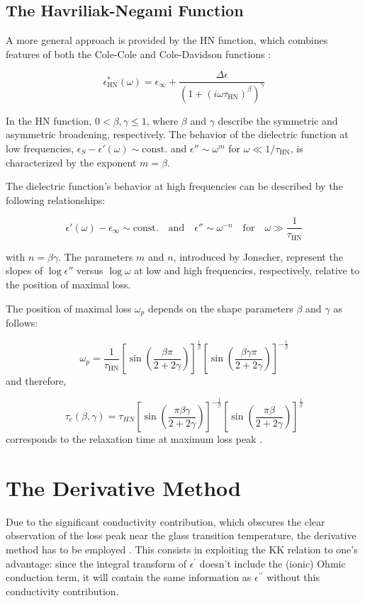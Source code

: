\subsection{The Havriliak-Negami Function}
A more general approach is provided by the \ac{HN} function, which combines features of both the Cole-Cole and Cole-Davidson functions \cite{kremer2003}:

\[
\epsilon^*_{\text{HN}}(\omega) = \epsilon_\infty + \frac{\Delta \epsilon}{(1 + (i \omega \tau_{\text{HN}})^\beta)^\gamma}
\]

In the HN function, \( 0 < \beta, \gamma \leq 1 \), where \( \beta \) and \( \gamma \) describe the symmetric and asymmetric broadening, respectively. The behavior of the dielectric function at low frequencies, \( \epsilon_S - \epsilon'(\omega) \sim \text{const.} \) and \( \epsilon'' \sim \omega^m \) for \( \omega \ll 1/\tau_{\text{HN}} \), is characterized by the exponent \( m = \beta \).


The dielectric function's behavior at high frequencies can be described by the following relationships:

\[
	\epsilon'(\omega) - \epsilon_\infty \sim \text{const.} \quad \text{and} \quad \epsilon'' \sim \omega^{-n} \quad \text{for} \quad \omega \gg \frac{1}{\tau_{\text{HN}}}
\]

with \( n = \beta \gamma \). The parameters \( m \) and \( n \), introduced by Jonscher, represent the slopes of \( \log \epsilon'' \) versus \( \log \omega \) at low and high frequencies, respectively, relative to the position of maximal loss.

The position of maximal loss \( \omega_p \) depends on the shape parameters \( \beta \) and \( \gamma \) as follows:

\[
\omega_p = \frac{1}{\tau_{\text{HN}}} \left[ \sin \left(\frac{\beta \pi}{2 + 2\gamma}\right) \right]^{\frac{1}{\beta}} \left[\sin \left(\frac{\beta \gamma \pi}{2 + 2\gamma}\right)\right]^{-\frac{1}{\beta}}
\]
and therefore,

\[
	\tau_c(\beta, \gamma) = \tau_{HN} \left[\sin\left(\frac{\pi \beta \gamma}{2 + 2\gamma}\right)\right]^{-\frac{1}{\beta}} \left[\sin\left(\frac{\pi \beta}{2 + 2\gamma}\right)\right]^{\frac{1}{\beta}}
\]
corresponds to the relaxation time at maximum loss peak \cite{winkler2021}.
\section{The Derivative Method}

Due to the significant conductivity contribution, which obscures the clear observation of the loss peak near the glass transition temperature, the derivative method has to be employed \cite{wubbenhorst}. %
This consists in exploiting the \ac{KK} relation to one's advantage: since the integral transform of $\epsilon^\prime$ doesn't include the (ionic) Ohmic conduction term, it will contain the same information as $\epsilon^{\prime\prime}$ without this conductivity contribution.

